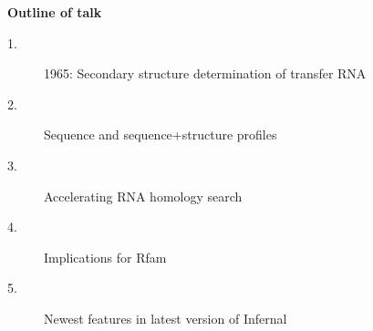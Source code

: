 \documentclass[landscape]{slides}
\begin{document}
\begin{slide}
\begin{center}
\textbf{Outline of talk}

\small
\begin{description}
\item[1.] 1965: Secondary structure determination of transfer RNA
\item[2.] Sequence and sequence+structure profiles
\item[3.] Accelerating RNA homology search
\item[4.] Implications for Rfam
\item[5.] Newest features in latest version of Infernal
\end{description}

\end{center}
\vfill
\end{slide}
\begin{slide}
\end{slide}
\end{document}
